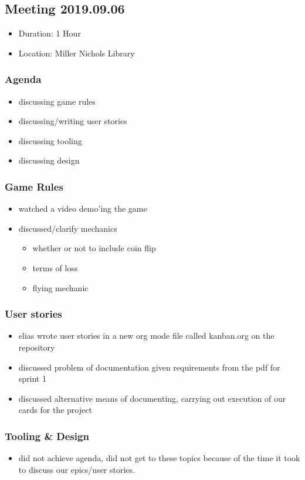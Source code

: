 \documentclass[11pt]{article}
\begin{document}
\subsection{Meeting 2019.09.06}
\label{sec:orgd60cf45}
\begin{itemize}
\item Duration: 1 Hour
\item Location: Miller Nichols Library
\end{itemize}
\subsubsection*{Agenda}
\label{sec:orga827735}
\begin{itemize}
\item discussing game rules
\item discussing/writing user stories
\item discussing tooling
\item discussing design
\end{itemize}
\subsubsection*{Game Rules}
\label{sec:org590420d}
\begin{itemize}
\item watched a video demo'ing the game
\item discussed/clarify mechanics
\begin{itemize}
\item whether or not to include coin flip
\item terms of loss
\item flying mechanic
\end{itemize}
\end{itemize}
\subsubsection*{User stories}
\label{sec:orgeb51b65}
\begin{itemize}
\item elias wrote user stories in a new org mode file called kanban.org on the
repository
\item discussed problem of documentation given requirements from the pdf for
sprint 1
\item discussed alternative means of documenting, carrying out execution of our
cards for the project
\end{itemize}
\subsubsection*{Tooling \& Design}
\label{sec:org2fea4a6}
\begin{itemize}
\item did not achieve agenda, did not get to these topics because of the time
it took to discuss our epics/user stories.
\end{itemize}
\end{document}
